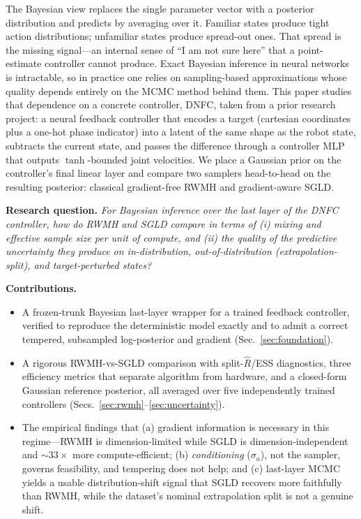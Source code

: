 \documentclass[11pt]{article}
\begin{document}
The Bayesian view replaces the single parameter vector with a posterior distribution and predicts by
averaging over it. Familiar states produce tight action distributions; unfamiliar states produce
spread-out ones. That spread is the missing signal---an internal sense of ``I am not sure here'' that a
point-estimate controller cannot produce. Exact Bayesian inference in neural networks is intractable, so
in practice one relies on sampling-based approximations whose quality depends entirely on the MCMC method
behind them. This paper studies that dependence on a concrete controller, DNFC, taken from a prior
research project: a neural feedback controller that encodes a target (cartesian coordinates plus a
one-hot phase indicator) into a latent of the same shape as the robot state, subtracts the current state,
and passes the difference through a controller MLP that outputs $\tanh$-bounded joint velocities. We place
a Gaussian prior on the controller's final linear layer and compare two samplers head-to-head on the
resulting posterior: classical gradient-free RWMH and gradient-aware SGLD.

\textbf{Research question.} \emph{For Bayesian inference over the last layer of the DNFC controller, how do
RWMH and SGLD compare in terms of (i) mixing and effective sample size per unit of compute, and (ii) the
quality of the predictive uncertainty they produce on in-distribution, out-of-distribution
(extrapolation-split), and target-perturbed states?}

\textbf{Contributions.}
\begin{itemize}[leftmargin=1.5em,itemsep=1pt]
  \item A frozen-trunk Bayesian last-layer wrapper for a trained feedback controller, verified to
  reproduce the deterministic model exactly and to admit a correct tempered, subsampled log-posterior and
  gradient (Sec.~\ref{sec:foundation}).
  \item A rigorous RWMH-vs-SGLD comparison with split-$\hat R$/ESS diagnostics, three efficiency metrics
  that separate algorithm from hardware, and a closed-form Gaussian reference posterior, all averaged over
  five independently trained controllers (Secs.~\ref{sec:rwmh}--\ref{sec:uncertainty}).
  \item The empirical findings that (a) gradient information is necessary in this regime---RWMH is
  dimension-limited while SGLD is dimension-independent and $\sim\!33\times$ more compute-efficient;
  (b) \emph{conditioning} ($\sigma_a$), not the sampler, governs feasibility, and tempering does not help;
  and (c) last-layer MCMC yields a usable distribution-shift signal that SGLD recovers more faithfully
  than RWMH, while the dataset's nominal extrapolation split is not a genuine shift.
\end{itemize}
\end{document}
